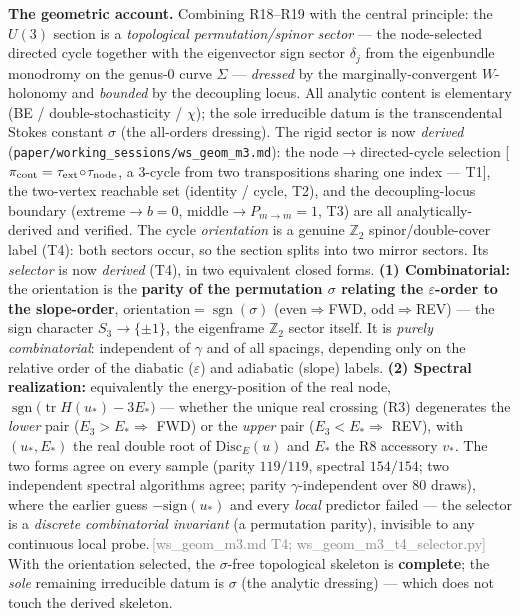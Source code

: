 \documentclass[aps,prd,reprint,nofootinbib]{revtex4-2}
\newcommand{\pnote}[1]{\textcolor{gray}{\footnotesize\,[#1]}}
\newcommand{\eps}{\varepsilon}
\newcommand{\Pmid}{P_{m\to m}}   %
\begin{document}
\textbf{The geometric account.} Combining R18--R19 with the central principle: the $U(3)$ section is a
\emph{topological permutation/spinor sector} --- the node-selected directed cycle together with the
eigenvector sign sector $\delta_j$ from the eigenbundle monodromy on the genus-0 curve $\Sigma$ ---
\emph{dressed} by the marginally-convergent $W$-holonomy and \emph{bounded} by the decoupling locus. All
analytic content is elementary (BE / double-stochasticity / $\chi$); the sole irreducible datum is the
transcendental Stokes constant $\sigma$ (the all-orders dressing). The rigid sector is now
\emph{derived} (\texttt{paper/working\_sessions/ws\_geom\_m3.md}): the node$\to$directed-cycle selection
[$\pi_{\rm cont}=\tau_{\rm ext}\!\circ\!\tau_{\rm node}$, a $3$-cycle from two transpositions sharing one
index --- T1], the two-vertex reachable set (identity / cycle, T2), and the decoupling-locus boundary
(extreme$\to b{=}0$, middle$\to\Pmid{=}1$, T3) are all analytically-derived and verified. The cycle
\emph{orientation} is a genuine $\mathbb Z_2$ spinor/double-cover label (T4): both sectors occur, so the
section splits into two mirror sectors. Its \emph{selector} is now \emph{derived} (T4), in two equivalent closed forms. \textbf{(1) Combinatorial:}
the orientation is the \textbf{parity of the permutation $\sigma$ relating the $\eps$-order to the
slope-order}, $\mathrm{orientation}=\operatorname{sgn}(\sigma)$ (even$\Rightarrow$FWD, odd$\Rightarrow$REV)
--- the sign character $S_3\to\{\pm1\}$, the eigenframe $\mathbb Z_2$ sector itself. It is \emph{purely
combinatorial}: independent of $\gamma$ and of all spacings, depending only on the relative order of the
diabatic ($\eps$) and adiabatic (slope) labels. \textbf{(2) Spectral realization:} equivalently the
energy-position of the real node, $\operatorname{sgn}\!\big(\operatorname{tr}H(u_*)-3E_*\big)$ --- whether
the unique real crossing (R3) degenerates the \emph{lower} pair ($E_3>E_*\Rightarrow$ FWD) or the
\emph{upper} pair ($E_3<E_*\Rightarrow$ REV), with $(u_*,E_*)$ the real double root of $\mathrm{Disc}_E(u)$
and $E_*$ the R8 accessory $v_*$. The two forms agree on every sample (parity $119/119$, spectral $154/154$;
two independent spectral algorithms agree; parity $\gamma$-independent over $80$ draws), where the earlier
guess $-\mathrm{sign}(u_*)$ and every \emph{local} predictor failed --- the selector is a \emph{discrete
combinatorial invariant} (a permutation parity), invisible to any continuous local
probe.\pnote{ws\_geom\_m3.md T4; ws\_geom\_m3\_t4\_selector.py} With the orientation selected, the
$\sigma$-free topological skeleton is \textbf{complete}; the \emph{sole} remaining irreducible datum is
$\sigma$ (the analytic dressing) --- which does not touch the derived skeleton.
\end{document}
